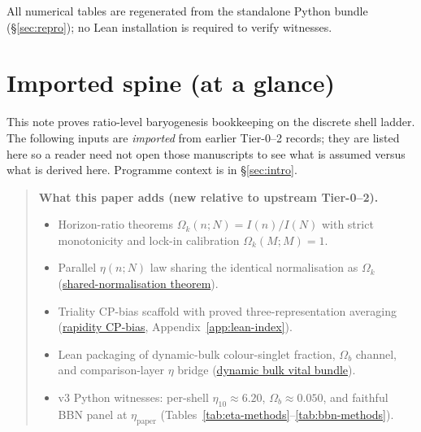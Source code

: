 \documentclass[11pt]{amsart}
\newcommand{\LeanEng}[2]{\hyperref[#1]{#2}}
\newenvironment{summarybox}{%
  \medskip\begin{quote}\small
}{%
  \end{quote}\medskip
}
\begin{document}
All numerical tables are regenerated from the standalone Python bundle
(\S\ref{sec:repro}); no Lean installation is required to verify witnesses.

\section*{Imported spine (at a glance)}
\label{sec:imported-spine}

This note proves ratio-level baryogenesis bookkeeping on the discrete shell
ladder. The following inputs are \emph{imported} from earlier Tier-0--2
records; they are listed here so a reader need not open those manuscripts
to see what is assumed versus what is derived here. Programme context is
in \S\ref{sec:intro}.

\begin{summarybox}
\noindent\textbf{What this paper adds (new relative to upstream Tier-0--2).}
\begin{itemize}[leftmargin=1.5em,nosep]
\item Horizon-ratio theorems $\Omega_k(n;N)=I(n)/I(N)$ with strict
  monotonicity and lock-in calibration $\Omega_k(M;M)=1$.
\item Parallel $\eta(n;N)$ law sharing the identical normalisation as
  $\Omega_k$ (\LeanEng{lean:eta-omega-same}{shared-normalisation theorem}).
\item Triality CP-bias scaffold with proved three-representation averaging
  (\LeanEng{lean:rapidity-cp-bias}{rapidity CP-bias},
  Appendix~\ref{app:lean-index}).
\item Lean packaging of dynamic-bulk colour-singlet fraction, $\Omega_b$
  channel, and comparison-layer $\eta$ bridge
  (\LeanEng{lean:dynamic-bulk-vital}{dynamic bulk vital bundle}).
\item v3 Python witnesses: per-shell $\eta_{10}\approx 6.20$,
  $\Omega_b\approx 0.050$, and faithful BBN panel at $\eta_{\mathrm{paper}}$
  (Tables~\ref{tab:eta-methods}--\ref{tab:bbn-methods}).
\end{itemize}
\end{summarybox}
\end{document}
